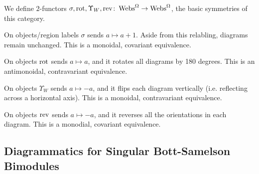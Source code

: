\begin{defn} \label{defn:symmetries of webs} We define $2$-functors $\sigma, \operatorname{rot}, \Upsilon_W, \operatorname{rev} \colon \operatorname{Webs}^{\Omega} \to \operatorname{Webs}^{\Omega}$, the basic symmetries of this category.

On objects/region labels $\sigma$ sends $a \mapsto a+1$. Aside from this relabling, diagrams remain unchanged. This is a monoidal, covariant equivalence.

On objects $\operatorname{rot}$ sends $a \mapsto a$, and it rotates all diagrams by 180 degrees. This is an antimonoidal, contravariant equivalence.

On objects $\Upsilon_W$ sends $a \mapsto -a$, and it flips each diagram vertically (i.e. reflecting across a horizontal axis). This is a monoidal, contravariant equivalence.

On objects $\operatorname{rev}$ sends $a \mapsto -a$, and it reverses all the orientations in each diagram. This is a monodial, covariant equivalence.
\end{defn}

\subsection{Diagrammatics for Singular Bott-Samelson Bimodules}
\label{subsec-diagrammatics for frob hypercube}
\label{subsec-diagrammatic singular bott-samelson bimodules}




